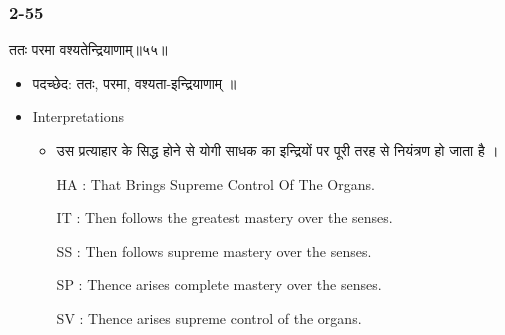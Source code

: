 \begin{frame}[fragile]\frametitle{2-55}
\begin{sanskrit}
ततः परमा वश्यतेन्द्रियाणाम्॥५५॥
\end{sanskrit}

	\begin{itemize}
	\item पदच्छेद: ततः, परमा, वश्यता-इन्द्रियाणाम् ॥
	\item Interpretations
		\begin{itemize}
		\item उस प्रत्याहार के सिद्ध होने से योगी साधक का इन्द्रियों पर पूरी तरह से नियंत्रण हो जाता है ।
		\item [HA]: That Brings Supreme Control Of The Organs.
		\item [IT]: Then follows the greatest mastery over the senses.
		\item [SS]: Then follows supreme mastery over the senses.
		\item [SP]: Thence arises complete mastery over the senses.
		\item [SV]: Thence arises supreme control of the organs. 
		\end{itemize}
	\end{itemize}	
\end{frame}

